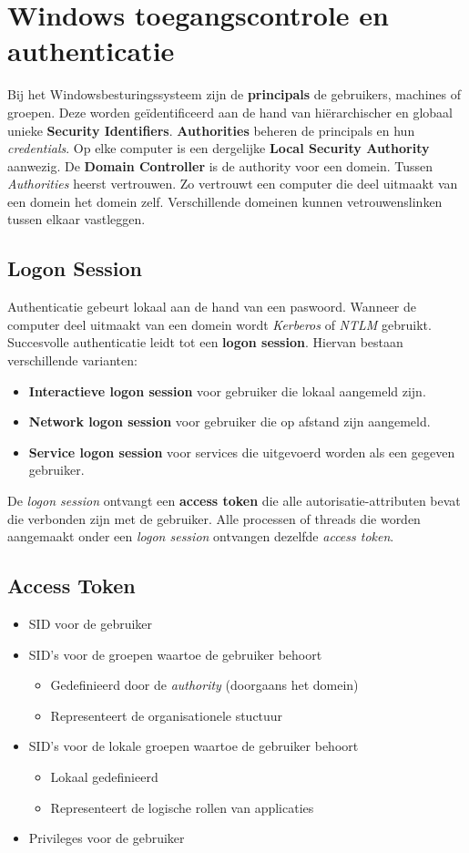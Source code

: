 \documentclass[../main.tex]{subfiles}
\begin{document}
\section{Windows toegangscontrole en authenticatie}
Bij het Windowsbesturingssysteem zijn de \textbf{principals} de gebruikers, machines of groepen. Deze worden ge\"identificeerd aan de hand van hi\"erarchischer en globaal unieke  \textbf{Security Identifiers}. \textbf{Authorities} beheren de principals en hun \textit{credentials}. Op elke computer is een dergelijke \textbf{Local Security Authority} aanwezig. De \textbf{Domain Controller} is de authority voor een domein. Tussen \textit{Authorities} heerst vertrouwen. Zo vertrouwt een computer die deel uitmaakt van een domein het domein zelf. Verschillende domeinen kunnen vetrouwenslinken tussen elkaar vastleggen.
\subsection{Logon Session}
Authenticatie gebeurt lokaal aan de hand van een paswoord. Wanneer de computer deel uitmaakt van een domein wordt \textit{Kerberos} of \textit{NTLM} gebruikt. Succesvolle authenticatie leidt tot een \textbf{logon session}. Hiervan bestaan verschillende varianten:
\begin{itemize}
	\item \textbf{Interactieve logon session} voor gebruiker die lokaal aangemeld zijn.
	\item \textbf{Network logon session} voor gebruiker die op afstand zijn aangemeld.
	\item \textbf{Service logon session} voor services die uitgevoerd worden als een gegeven gebruiker.
\end{itemize}
De \textit{logon session} ontvangt een \textbf{access token} die alle autorisatie-attributen bevat die verbonden zijn met de gebruiker. Alle processen of threads die worden aangemaakt onder een \textit{logon session} ontvangen dezelfde \textit{access token}. 

\subsection{Access Token}
\begin{itemize}
	\item SID voor de gebruiker
	\item SID's voor de groepen waartoe de gebruiker behoort
	\begin{itemize}
		\item Gedefinieerd door de \textit{authority} (doorgaans het domein)
		\item Representeert de organisationele stuctuur
	\end{itemize}
	\item SID's voor de lokale groepen waartoe de gebruiker behoort
	\begin{itemize}
		\item Lokaal gedefinieerd
		\item Representeert de logische rollen van applicaties
	\end{itemize}
	\item Privileges voor de gebruiker
\end{itemize}
\end{document}
